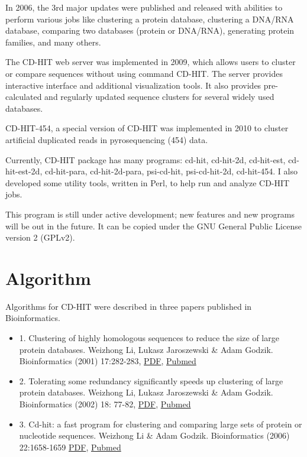 \documentclass[12pt,a4paper]{article}
\begin{document}
In 2006, the 3rd major updates were published and released with abilities to perform various jobs like clustering a protein database, clustering a DNA/RNA database, comparing two databases (protein or DNA/RNA), generating protein families, and many others.

The CD-HIT web server was implemented in 2009, which allows users to cluster or compare sequences without using command CD-HIT. The server provides interactive interface and additional visualization tools. It also provides pre-calculated and regularly updated sequence clusters for several widely used databases.

CD-HIT-454, a special version of CD-HIT was implemented in 2010 to cluster artificial duplicated reads in pyrosequencing (454) data.

Currently, CD-HIT package has many programs: cd-hit, cd-hit-2d, cd-hit-est, cd-hit-est-2d, cd-hit-para, cd-hit-2d-para, psi-cd-hit, psi-cd-hit-2d, cd-hit-454. I also developed some utility tools, written in Perl, to help run and analyze CD-HIT jobs.

This program is still under active development; new features and new programs will be out in the future.
It can be copied under the GNU General Public License version 2 (GPLv2).

\clearpage
\section{Algorithm }

Algorithms for CD-HIT were described in three papers published in Bioinformatics.

\begin{itemize}
 \item 1. Clustering of highly homologous sequences to reduce the size of large protein databases. Weizhong Li, Lukasz Jaroszewski \& Adam Godzik. Bioinformatics (2001) 17:282-283, \href{http:\slash \slash bioinformatics.oupjournals.org\slash cgi\slash reprint\slash 17\slash 3\slash 282.pdf}{PDF}, \href{http:\slash \slash www.ncbi.nlm.nih.gov\slash entrez\slash query.fcgi?cmd=Retrieve&db=pubmed&dopt=Abstract&list_uids=11294794}{Pubmed}

\item 2. Tolerating some redundancy significantly speeds up clustering of large protein databases. Weizhong Li, Lukasz Jaroszewski \& Adam Godzik. Bioinformatics (2002) 18: 77-82, \href{http:\slash \slash bioinformatics.oupjournals.org\slash cgi\slash reprint\slash 18\slash 1\slash 77.pdf}{PDF}, \href{http:\slash \slash www.ncbi.nlm.nih.gov\slash entrez\slash query.fcgi?cmd=Retrieve&db=pubmed&dopt=Abstract&list_uids=11836214}{Pubmed}

\item 3. Cd-hit: a fast program for clustering and comparing large sets of protein or nucleotide sequences. Weizhong Li \& Adam Godzik. Bioinformatics (2006) 22:1658-1659 \href{http:\slash \slash bioinformatics.oxfordjournals.org\slash cgi\slash reprint\slash 22\slash 13\slash 1658}{PDF}, \href{http:\slash \slash www.ncbi.nlm.nih.gov\slash entrez\slash query.fcgi?db=pubmed&cmd=Retrieve&dopt=Abstract&list_uids=16731699}{Pubmed}

\end{itemize}
\end{document}
